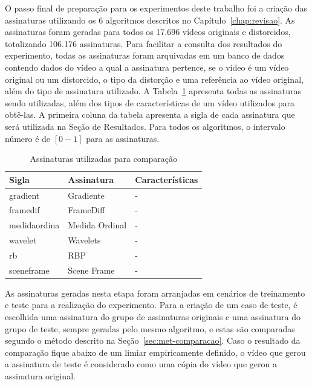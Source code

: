 O passo final de preparação para os experimentos deste trabalho foi a criação das assinaturas utilizando os 6 algoritmos descritos no Capítulo~\ref{chap:revisao}. As assinaturas foram geradas para todos os 17.696 vídeos originais e distorcidos, totalizando 106.176 assinaturas. Para facilitar a consulta dos resultados do experimento, todas as assinaturas foram arquivadas em um banco de dados contendo dados do vídeo a qual a assinatura pertence, se o vídeo é um vídeo original ou um distorcido, o tipo da distorção e uma referência ao vídeo original, além do tipo de assinatura utilizado. A Tabela~\ref{tab:assinaturas} apresenta todas as assinaturas sendo utilizadas, além dos tipos de características de um vídeo utilizados para obtê-las. A primeira coluna da tabela apresenta a sigla de cada assinatura que será utilizada na Seção de Resultados. Para todos os algoritmos, o intervalo número é de $[0 - 1]$ para as assinaturas.


\begin{table}[h]
    \centering
    \caption{Assinaturas utilizadas para comparação}
    \label{tab:assinaturas}
    \begin{tabular}{|p{}|p{}|p{}|} \hline
        \textbf{Sigla} & \textbf{Assinatura} & \textbf{Características} \\ \hline
        gradient & Gradiente & - \\ \hline
        framedif & FrameDiff & - \\ \hline
        medidaordina & Medida Ordinal & - \\ \hline
        wavelet & Wavelets & - \\ \hline
        rb & RBP & - \\ \hline
        sceneframe & Scene Frame & - \\ \hline
    \end{tabular}
\end{table}

As assinaturas geradas nesta etapa foram arranjadas em cenários de treinamento e teste para a realização do experimento. Para a criação de um caso de teste, é escolhida uma assinatura do grupo de assinaturas originais e uma assinatura do grupo de teste, sempre geradas pelo mesmo algoritmo, e estas são comparadas segundo o método descrito na Seção~\ref{sec:met-comparacao}. Caso o resultado da comparação fique abaixo de um limiar empiricamente definido, o vídeo que gerou a assinatura de teste é considerado como uma cópia do vídeo que gerou a assinatura original.

